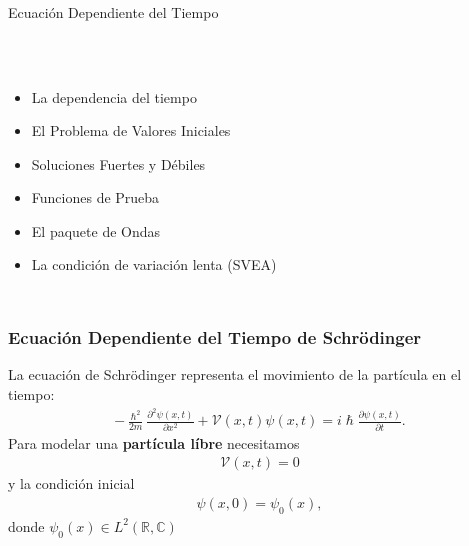 \documentclass[aspectratio=1610]{beamer}
\newcommand*{\field}[1]{\mathbb{#1}}
\begin{document}
\begin{frame}
\begin{columns}
\column{37em}
\vspace{1cm}
\Huge{\centerline{Ecuación Dependiente del Tiempo}}
\end{columns}
\end{frame}


\begin{frame}
\frametitle{ }
\begin{columns}
\column{37em}
\begin{itemize}\itemsep1em
  \justifying
  \item  \textcolor{Ocean}{La dependencia del tiempo} 
  \item  \textcolor{Ocean}{El Problema de Valores Iniciales} 
  \item  \textcolor{Ocean}{Soluciones Fuertes y Débiles} 
  \item  \textcolor{TextGreen}{Funciones de Prueba}
  \item  \textcolor{TextGreen}{El paquete de Ondas}
  \item  \textcolor{TextGreen}{La condición de variación lenta (SVEA)}
\end{itemize}
\end{columns}
\end{frame}




\begin{frame}
\frametitle{Ecuación Dependiente del Tiempo de Schrödinger}

La ecuación de Schrödinger representa el movimiento de la partícula en el tiempo:
\begin{align}
    -\frac{\hslash^2}{2m}\frac{\partial^2\psi(x,t)}{\partial x^2} + \mathcal{V}(x,t)\psi(x,t) = i\hslash\frac{\partial\psi(x,t)}{\partial t}.
    \label{eq:ECDepTiemp}
\end{align}
Para modelar una \textbf{partícula líbre} necesitamos 
\begin{align*}
    \mathcal{V}(x,t) = 0
\end{align*}  
y la condición inicial
\begin{align*}
    \psi(x,0) = \psi_{0}(x),
\end{align*}
donde $\psi_{0}(x) \in L^{2}(\field{R},\field{C})$

\begin{columns}
\column{37em}
\end{columns}
\end{frame}
\end{document}
